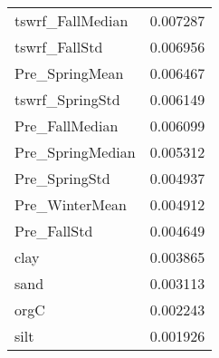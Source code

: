 \begin{tabular}{lr}
tswrf_FallMedian & 0.007287 \\
tswrf_FallStd & 0.006956 \\
Pre_SpringMean & 0.006467 \\
tswrf_SpringStd & 0.006149 \\
Pre_FallMedian & 0.006099 \\
Pre_SpringMedian & 0.005312 \\
Pre_SpringStd & 0.004937 \\
Pre_WinterMean & 0.004912 \\
Pre_FallStd & 0.004649 \\
clay & 0.003865 \\
sand & 0.003113 \\
orgC & 0.002243 \\
silt & 0.001926 \\
\bottomrule
\end{tabular}
